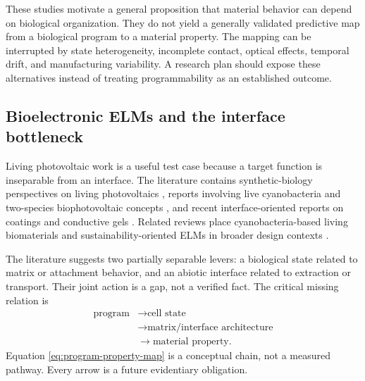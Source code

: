 \documentclass[conference]{IEEEtran}
\begin{document}
These studies motivate a general proposition that material behavior can depend on biological organization. They do not yield a generally validated predictive map from a biological program to a material property. The mapping can be interrupted by state heterogeneity, incomplete contact, optical effects, temporal drift, and manufacturing variability. A research plan should expose these alternatives instead of treating programmability as an established outcome.

\subsection{Bioelectronic ELMs and the interface bottleneck}

Living photovoltaic work is a useful test case because a target function is inseparable from an interface. The literature contains synthetic-biology perspectives on living photovoltaics \cite{schuergers2017}, reports involving live cyanobacteria and two-species biophotovoltaic concepts \cite{saper2018,zhu2019}, and recent interface-oriented reports on coatings and conductive gels \cite{reggente2024,chen2025}. Related reviews place cyanobacteria-based living biomaterials and sustainability-oriented ELMs in broader design contexts \cite{goodchild2023,an2023,islam2023}.

The literature suggests two partially separable levers: a biological state related to matrix or attachment behavior, and an abiotic interface related to extraction or transport. Their joint action is a gap, not a verified fact. The critical missing relation is
\begin{equation}
  \begin{aligned}
    \text{program} &\longrightarrow \text{cell state}\\
    &\longrightarrow \text{matrix/interface architecture}\\
    &\longrightarrow \text{material property}.
  \end{aligned}
  \label{eq:program-property-map}
\end{equation}
Equation \eqref{eq:program-property-map} is a conceptual chain, not a measured pathway. Every arrow is a future evidentiary obligation.
\end{document}
